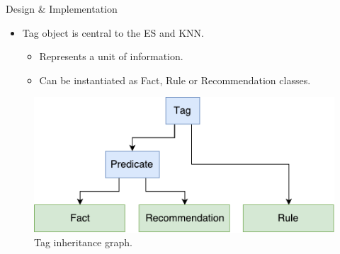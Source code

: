 \documentclass[final]{beamer} %
\begin{document}
\begin{frame}
\begin{columns}
\begin{column}{.35\textwidth}
{\begin{block}{Design \& Implementation}
					\begin{itemize}
						\item Tag object is central to the ES and KNN.
						\begin{itemize}
							\item Represents a unit of information.
							\item Can be instantiated as Fact, Rule or Recommendation classes.
						\end{itemize}
					\end{itemize}
				
					\begin{figure}[!htb]
						\centering
						\includegraphics[width=0.5\columnwidth]{figures/prometheus_tags.pdf}
						\caption
						{Tag inheritance graph.}
					\end{figure}
					
					

\end{block}}
\end{column}
\end{columns}
\end{frame}
\end{document}
